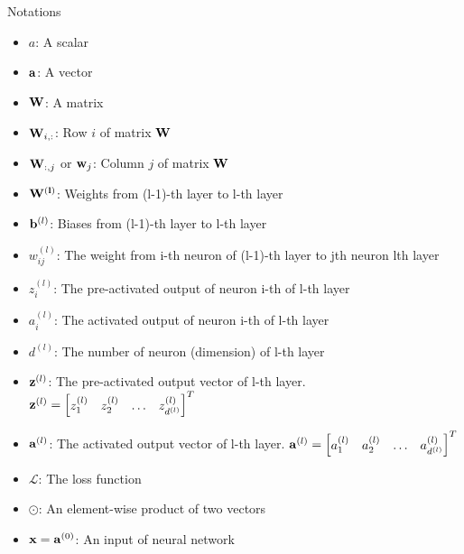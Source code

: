 \documentclass[10pt]{beamer}
\theoremstyle{remark}
\theoremstyle{definition}
\begin{document}
\begin{frame}[allowframebreaks]{Notations}
	\begin{itemize}
		\item $a$: A scalar
  		\item $\bold{a}$: A vector
    	\item $\bold{W}$: A matrix
     	\item $\bold{W}_{i,:}$: Row $i$ of matrix $\bold{W}$
      	\item $\bold{W}_{:,j}$ or $\bold{w}_j$: Column $j$ of matrix $\bold{W}$
       	\item $\bold{W^{(l)}}$: Weights from (l-1)-th layer to l-th layer
        \item $\bold{b}^{(l)}$: Biases from (l-1)-th layer to l-th layer
        \item $w_{ij}^{(l)}$: The weight from i-th neuron of (l-1)-th layer to jth neuron lth layer
        \item $z_{i}^{(l)}$: The pre-activated output of neuron i-th of l-th layer
        \item $a_{i}^{(l)}$: The activated output of neuron i-th of l-th layer
        \item $d^{(l)}$: The number of neuron (dimension) of l-th layer
        \item $\bold{z}^{(l)}$: The pre-activated output vector of l-th layer. $\bold{z}^{(l)} = \begin{bmatrix} z_1^{(l)} & z_2^{(l)} & \dots & z_{d^{(l)}}^{(l)}\end{bmatrix}^T$
        \item $\bold{a}^{(l)}$: The activated output vector of l-th layer. $\bold{a}^{(l)} = \begin{bmatrix} a_1^{(l)} & a_2^{(l)} &\dots & a_{d^{(l)}}^{(l)}\end{bmatrix}^T$
        \item $\mathcal{L}$: The loss function
        \item $\odot$: An element-wise product of two vectors
        \item $\bold{x}=\bold{a}^{(0)}$: An input of neural network
	\end{itemize}

\end{frame}
\end{document}
